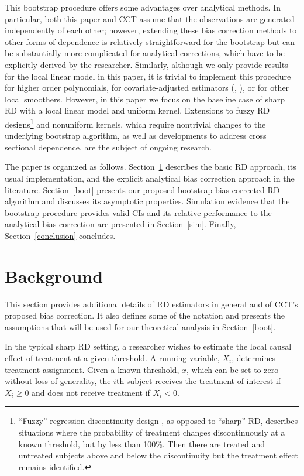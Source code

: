 \documentclass[12pt,fleqn]{article}
\begin{document}
This bootstrap procedure offers some advantages over analytical methods.  In
particular, both this paper and CCT assume that the observations are generated
independently of each other; however, extending these bias correction methods to
other forms of dependence is relatively straightforward for the bootstrap but
can be substantially more complicated for analytical
corrections, which have to be explicitly derived by the researcher. Similarly,
although we only provide results for the local linear model in this paper, it is
trivial to implement this procedure for higher order polynomials, for
covariate-adjusted estimators (\citealp{frolich2007}, \citealp{calonico2015}),
or for other local smoothers. \citep{loader2006} However, in this paper we focus
on the baseline case of sharp RD with a local linear model and uniform
kernel. Extensions to fuzzy RD designs\footnote{%
  ``Fuzzy'' regression discontinuity design \citep{HTV2001}, as opposed to
  ``sharp'' RD, describes situations where the probability of treatment changes
  discontinuously at a known threshold, but by less than 100\%. Then there are
  treated and untreated subjects above and below the discontinuity but the
  treatment effect remains identified.} %
and nonuniform kernels, which require nontrivial changes to the underlying
bootstrap algorithm, as well as developments to address cross sectional
dependence, are the subject of ongoing research.

The paper is organized as follows. Section~\ref{background} describes the basic
RD approach, its usual implementation, and the explicit analytical bias
correction approach in the literature. Section~\ref{boot} presents our proposed
bootstrap bias corrected RD algorithm and discusses its asymptotic
properties. Simulation evidence that the bootstrap procedure provides valid CIs
and its relative performance to the analytical bias correction are presented in
Section~\ref{sim}.
Finally, Section~\ref{conclusion} concludes.

\section{Background}\label{background}

This section provides additional details of RD estimators in general and of
CCT's proposed bias correction. It also defines some of the notation and
presents the assumptions that will be used for our theoretical analysis in
Section~\ref{boot}.

In the typical sharp RD setting, a researcher wishes to estimate the local
causal effect of treatment at a given threshold. A running variable, $X_{i}$,
determines treatment assignment.  Given a known threshold, $\bar{x}$, which can
be set to zero without loss of generality, the $i$th subject receives the
treatment of interest if $X_{i} \geq 0$ and does not receive treatment if
$X_{i} < 0$.
\end{document}
